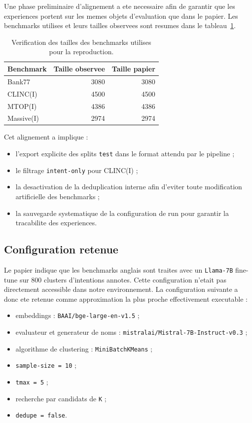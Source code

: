 Une phase preliminaire d'alignement a ete necessaire afin de garantir que les
experiences portent sur les memes objets d'evaluation que dans le papier. Les
benchmarks utilises et leurs tailles observees sont resumes dans le
tableau~\ref{tab:benchmark-sizes}.

\begin{table}[h]
  \centering
  \begin{tabular}{lrr}
    \toprule
    Benchmark & Taille observee & Taille papier \\
    \midrule
    Bank77 & 3080 & 3080 \\
    CLINC(I) & 4500 & 4500 \\
    MTOP(I) & 4386 & 4386 \\
    Massive(I) & 2974 & 2974 \\
    \bottomrule
  \end{tabular}
  \caption{Verification des tailles des benchmarks utilises pour la reproduction.}
  \label{tab:benchmark-sizes}
\end{table}

Cet alignement a implique :
\begin{itemize}[leftmargin=*]
  \item l'export explicite des splits \texttt{test} dans le format attendu par
  le pipeline ;
  \item le filtrage \texttt{intent-only} pour CLINC(I) ;
  \item la desactivation de la deduplication interne afin d'eviter toute
  modification artificielle des benchmarks ;
  \item la sauvegarde systematique de la configuration de run pour garantir la
  tracabilite des experiences.
\end{itemize}

\subsection{Configuration retenue}

Le papier indique que les benchmarks anglais sont traites avec un
\texttt{Llama-7B} fine-tune sur 800 clusters d'intentions annotes. Cette
configuration n'etait pas directement accessible dans notre environnement. La
configuration suivante a donc ete retenue comme approximation la plus proche
effectivement executable :
\begin{itemize}[leftmargin=*]
  \item embeddings : \texttt{BAAI/bge-large-en-v1.5} ;
  \item evaluateur et generateur de noms :
  \texttt{mistralai/Mistral-7B-Instruct-v0.3} ;
  \item algorithme de clustering : \texttt{MiniBatchKMeans} ;
  \item \texttt{sample-size = 10} ;
  \item \texttt{tmax = 5} ;
  \item recherche par candidats de \texttt{K} ;
  \item \texttt{dedupe = false}.
\end{itemize}

